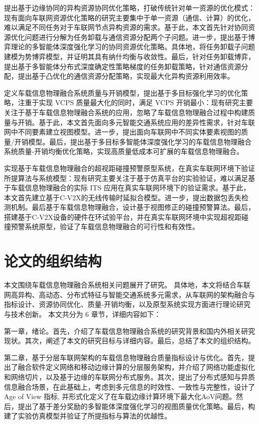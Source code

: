  提出基于边缘协同的异构资源协同优化策略，打破传统针对单一资源的优化模式：现有面向车联网资源优化策略的研究主要集中于单一资源（通信、计算）的优化，难以满足不同任务对于车联网节点异构资源的需求。基于此，本文首先针对协同资源优化问题进行分解为任务卸载与通信资源分配两个子问题。进一步，提出基于博弈理论的多智能体深度强化学习的协同资源优化策略。具体地，将任务卸载子问题建模为势博弈模型，并证明其具有纳什均衡与收敛性。最后，针对任务卸载博弈，提出基于多智能体分布式深度确定性策略梯度的任务卸载策略，针对通信资源分配，提出基于凸优化的通信资源分配策略，实现最大化异构资源利用效率。

 定义车载信息物理融合系统质量与开销模型，提出基于多目标强化学习的优化策略，注重于实现 VCPS 质量最大化的同时，满足 VCPS 开销最小：现有研究主要关注于基于车载信息物理融合系统的应用，忽略了车载信息物理融合过程中构建质量与开销。基于此，本文首先面向多元智能交通系统应用的差异性需求，针对车联网中不同要素建立视图模型。进一步，提出面向车联网中不同实体要素视图的质量/开销模型。最后，提出基于多目标多智能体深度强化学习的车载信息物理融合系统质量-开销均衡优化策略，实现高质量低成本可扩展的车载信息物理融合。

 实现基于车载信息物理融合的超视距碰撞预警原型系统，在真实车联网环境下验证所提算法与系统模型：现有研究主要关注于基于仿真平台的实验验证，难以满足基于车载信息物理融合的实际 ITS 应用在真实车联网环境下的验证需求。基于此，本文首先建立基于C-V2X的无线传输时延拟合模型。进一步，提出数据包丢失检测机制。最后基于车载信息物理融合，设计基于视图修正的碰撞预警算法。最后，搭建基于C-V2X设备的硬件在环试验平台，并在真实车联网环境中实现超视距碰撞预警系统原型，验证了车载信息物理融合的可行性和有效性。


\section{论文的组织结构}\label{section 1-7}
本文围绕车载信息物理融合系统相关问题展开了研究。
具体地，本文将结合车联网高异构、高动态、分布式特征与智能交通系统多元需求，从车联网的架构融合与指标设计、资源协同优化、质量-开销均衡，以及原型系统实现方面进行理论研究与技术创新。
本文共分为 6 章节，详细内容如下：

第一章，绪论。首先，介绍了车载信息物理融合系统的研究背景和国内外相关研究现状。其次，阐述了本文的研究目标与详细内容。最后，总结了本文的组织结构。

第二章，基于分层车联网架构的车载信息物理融合质量指标设计与优化。首先，提出了融合软件定义网络和移动边缘计算的分层服务架构，并介绍了网络功能虚拟化和网络切片，以及基于边缘的车联网分布式服务。其次，提出了分布式感知与异质信息融合场景，在此基础上，考虑到多元信息的时效性、一致性与完整性，设计了 Age of View 指标, 并形式化定义了在车载边缘计算环境下最大化AoV问题。然后，提出了基于差分奖励的多智能体深度强化学习的视图质量优化策略。最后，构建了实验仿真模型并验证了所提指标与算法的优越性。

